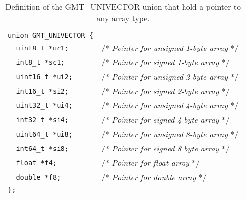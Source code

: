 \documentclass[11pt]{report}
\begin{document}
\begin{table}[h]
\small
\centering
\begin{tabular}{ll} \hline
\verb!union GMT_UNIVECTOR {! & \\
\verb!  uint8_t *uc1;!  & /* \emph{Pointer for unsigned 1-byte array} */ \\
\verb!  int8_t *sc1;!   & /* \emph{Pointer for signed 1-byte array} */ \\
\verb!  uint16_t *ui2;! & /* \emph{Pointer for unsigned 2-byte array} */ \\
\verb!  int16_t *si2;!  & /* \emph{Pointer for signed 2-byte array} */ \\
\verb!  uint32_t *ui4;! & /* \emph{Pointer for unsigned 4-byte array} */ \\
\verb!  int32_t *si4;!  & /* \emph{Pointer for signed 4-byte array} */ \\
\verb!  uint64_t *ui8;! & /* \emph{Pointer for unsigned 8-byte array} */ \\
\verb!  int64_t *si8;!  & /* \emph{Pointer for signed 8-byte array} */ \\
\verb!  float *f4;!     & /* \emph{Pointer for float array} */ \\
\verb!  double *f8;!    & /* \emph{Pointer for double array} */ \\
\verb!};!               & \\
\hline
\end{tabular}
\caption{Definition of the GMT\_UNIVECTOR union that hold a pointer to any array type.}
\label{tbl:univector}
\end{table}
\end{document}
